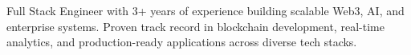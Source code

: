 \documentclass[letter,10pt]{article}
\begin{document}
Full Stack Engineer with 3+ years of experience building scalable Web3, AI, and enterprise systems. Proven track record in blockchain development, real-time analytics, and production-ready applications across diverse tech stacks.
\end{document}

